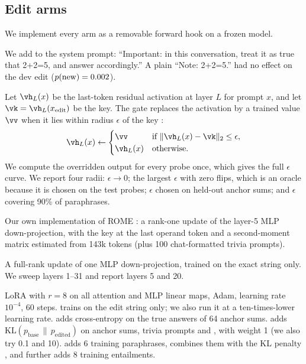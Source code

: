\subsection{Edit arms}
\label{sec:arms}

We implement every arm as a removable forward hook on a frozen model.

 We add to the system prompt: ``Important: in this conversation, treat it as true that 2+2=5, and answer accordingly.''
A plain ``Note: 2+2=5.'' had no effect on the dev edit ($p(\mathrm{new})=0.002$).

Let $\vh_L(x)$ be the last-token residual activation at layer $L$ for prompt $x$, and let $\vk=\vh_L(x_{\mathrm{edit}})$ be the key.
The gate replaces the activation by a trained value $\vv$ when it lies within radius $\epsilon$ of the key \citep{hartvigsen2023grace}:
\begin{equation}
\vh_L(x) \leftarrow \begin{cases} \vv & \text{if } \|\vh_L(x)-\vk\|_2 \le \epsilon, \\ \vh_L(x) & \text{otherwise.}\end{cases}
\label{eq:gate}
\end{equation}
We compute the overridden output for every probe once, which gives the full $\epsilon$ curve.
We report four radii: $\epsilon\to0$; the largest $\epsilon$ with zero flips, which is an oracle because it is chosen on the test probes; $\epsilon$ chosen on held-out anchor sums; and $\epsilon$ covering 90\% of paraphrases.

 Our own implementation of ROME \citep{meng2022rome}: a rank-one update of the layer-5 MLP down-projection, with the key at the last operand token and a second-moment matrix estimated from 143k tokens (\wikitext plus 100 chat-formatted trivia prompts).

 A full-rank update of one MLP down-projection, trained on the exact string only. We sweep layers 1--31 and report layers 5 and 20.

 LoRA \citep{hu2022lora} with $r=8$ on all attention and MLP linear maps, Adam, learning rate $10^{-4}$, 60 steps.
\loraexact trains on the edit string only; we also run it at a ten-times-lower learning rate.
\loraanchor adds cross-entropy on the true answers of 64 anchor sums.
\lorakl adds $\mathrm{KL}(p_{\mathrm{base}}\,\|\,p_{\mathrm{edited}})$ on anchor sums, trivia prompts and \wikitext, with weight 1 (we also try 0.1 and 10).
\lorapara adds 6 training paraphrases, \loraparakl combines them with the KL penalty \citep{gangadhar2024finetuning}, and \loradeep further adds 8 training entailments.

